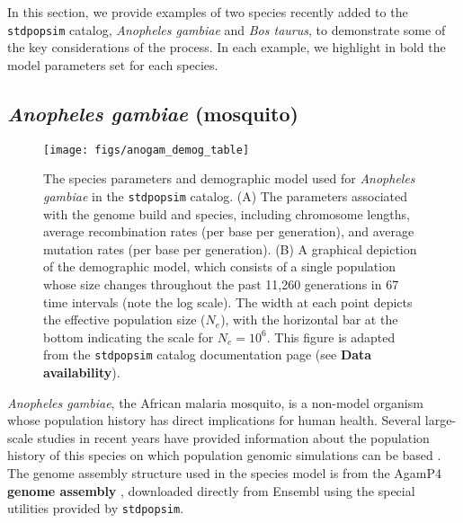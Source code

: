 \documentclass[hidelinks]{article}
\newcommand{\stdpopsim}{\texttt{stdpopsim}\xspace}
\begin{document}
In this section, we provide examples of two species recently added to the \stdpopsim catalog,
\textit{Anopheles gambiae} and \textit{Bos taurus},
to demonstrate some of the key considerations of the process.
In each example, we highlight in bold the model parameters set for each species.

\subsection*{\texorpdfstring{\emph{Anopheles gambiae} (mosquito)}{Anopheles gambiae (mosquito)}}
    \label{AnoGam}
    
\begin{figure}[b!]
	\texttt{[image: figs/anogam\_demog\_table]}
	\caption{The species parameters and demographic model used for \emph{Anopheles gambiae} in the \stdpopsim catalog.
	(A) The parameters associated with the genome build and species, including
	chromosome lengths, average recombination rates (per base per generation),
	and average mutation rates (per base per generation).
	(B) A graphical depiction of the demographic model,
	which consists of a single population whose size changes throughout the past 11,260 generations in 67 time intervals (note the log scale). The width at each point depicts the effective population size ($N_e$), with the horizontal bar at the bottom indicating the scale for $N_e=10^6$.
	This figure is adapted from the \stdpopsim catalog documentation page (see {\bf Data availability}).
		\label{fig:anogam} }
\end{figure}


\emph{Anopheles gambiae}, the African malaria mosquito, is 
a non-model organism whose population history has direct implications for human health.
Several large-scale studies in recent years have provided information about the
population history of this species on which population genomic simulations can be based \citep[e.g.,][]{Miles2017, clarkson2020genome}.
The genome assembly structure used in the species model is from
the AgamP4 \textbf{genome assembly} \citep{Sharakhova2007},
downloaded directly from Ensembl \citep{ensembl2021}
using the special utilities provided by \stdpopsim.
\end{document}

